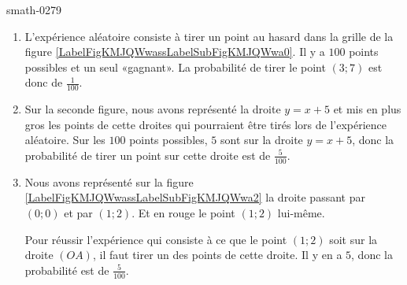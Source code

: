 
\begin{corrige}{smath-0279}

    \begin{enumerate}
        \item
            L'expérience aléatoire consiste à tirer un point au hasard dans la grille de la figure \ref{LabelFigKMJQWwassLabelSubFigKMJQWwa0}. Il y a \( 100\) points possibles et un seul «gagnant». La probabilité de tirer le point \( (3;7)\) est donc de \( \frac{1}{ 100 }\).
        \item
            Sur la seconde figure, nous avons représenté la droite \( y=x+5\) et mis en plus gros les points de cette droites qui pourraient être tirés lors de l'expérience aléatoire. Sur les \( 100\) points possibles, \( 5\) sont sur la droite \( y=x+5\), donc la probabilité de tirer un point sur cette droite est de \( \frac{ 5 }{ 100 }\).
        \item
            Nous avons représenté sur la figure \ref{LabelFigKMJQWwassLabelSubFigKMJQWwa2} la droite passant par \( (0;0)\) et par \( (1;2)\). Et en rouge le point \( (1;2)\) lui-même.
            
            Pour réussir l'expérience qui consiste à ce que le point \( (1;2)\) soit sur la droite \( (OA)\), il faut tirer un des points de cette droite. Il y en a \( 5\), donc la probabilité est de \( \frac{ 5 }{ 100 }\).
    \end{enumerate}

    \newcommand{\CaptionFigKMJQWwa}{Les dessins de l'exercice \ref{exosmath-0279}.}


\end{corrige}
